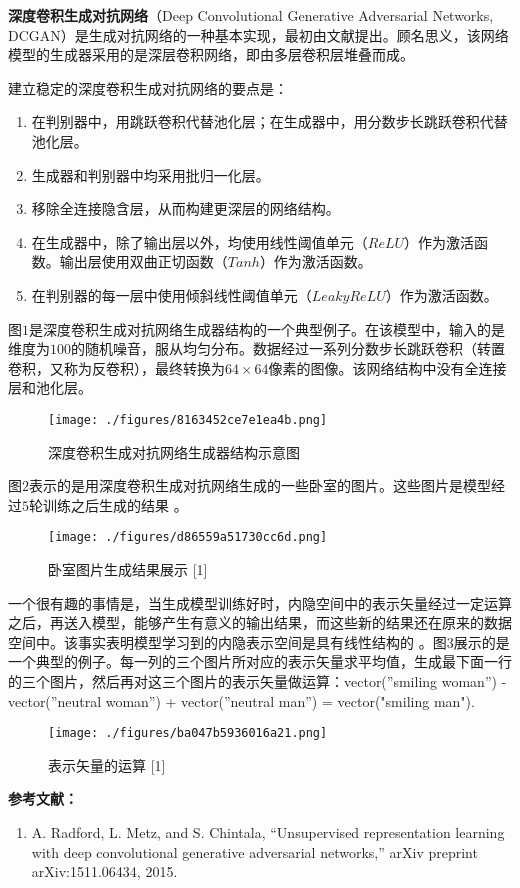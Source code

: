 

\textbf{深度卷积生成对抗网络}（Deep Convolutional Generative Adversarial Networks, DCGAN）是生成对抗网络的一种基本实现，最初由文献\cite{DCGAN}提出。顾名思义，该网络模型的生成器采用的是深层卷积网络，即由多层卷积层堆叠而成。

建立稳定的深度卷积生成对抗网络的要点是\cite{DCGAN}：
\begin{enumerate}
\item 在判别器中，用跳跃卷积代替池化层；在生成器中，用分数步长跳跃卷积代替池化层。
\item 生成器和判别器中均采用批归一化层。
\item 移除全连接隐含层，从而构建更深层的网络结构。
\item 在生成器中，除了输出层以外，均使用线性阈值单元（$ReLU$）作为激活函数。输出层使用双曲正切函数（$Tanh$）作为激活函数。
\item 在判别器的每一层中使用倾斜线性阈值单元（$Leaky ReLU$）作为激活函数。
\end{enumerate}

图$1$是深度卷积生成对抗网络生成器结构的一个典型例子。在该模型中，输入的是维度为$100$的随机噪音，服从均匀分布。数据经过一系列分数步长跳跃卷积（转置卷积，又称为反卷积），最终转换为$64 \times64$像素的图像。该网络结构中没有全连接层和池化层。
\begin{figure}[ht]
\centering
\texttt{[image: ./figures/8163452ce7e1ea4b.png]}
\caption{深度卷积生成对抗网络生成器结构示意图 \cite{DCGAN}} \label{fig_DCGAN_1}
\end{figure}

图$2$表示的是用深度卷积生成对抗网络生成的一些卧室的图片。这些图片是模型经过$5$轮训练之后生成的结果 \cite{DCGAN}。
\begin{figure}[ht]
\centering
\texttt{[image: ./figures/d86559a51730cc6d.png]}
\caption{卧室图片生成结果展示 [1]} \label{fig_DCGAN_2}
\end{figure}

一个很有趣的事情是，当生成模型训练好时，内隐空间中的表示矢量经过一定运算之后，再送入模型，能够产生有意义的输出结果，而这些新的结果还在原来的数据空间中。该事实表明模型学习到的内隐表示空间是具有线性结构的 \cite{DCGAN}。图$3$展示的是一个典型的例子。每一列的三个图片所对应的表示矢量求平均值，生成最下面一行的三个图片，然后再对这三个图片的表示矢量做运算：vector(”smiling woman”) - vector(”neutral woman”) + vector(”neutral man”) = vector("smiling man").

\begin{figure}[ht]
\centering
\texttt{[image: ./figures/ba047b5936016a21.png]}
\caption{表示矢量的运算 [1]} \label{fig_DCGAN_3}
\end{figure}




\textbf{参考文献：}
\begin{enumerate}
\item A. Radford, L. Metz, and S. Chintala, “Unsupervised representation learning with deep convolutional generative adversarial networks,” arXiv preprint arXiv:1511.06434, 2015.
\end{enumerate}
